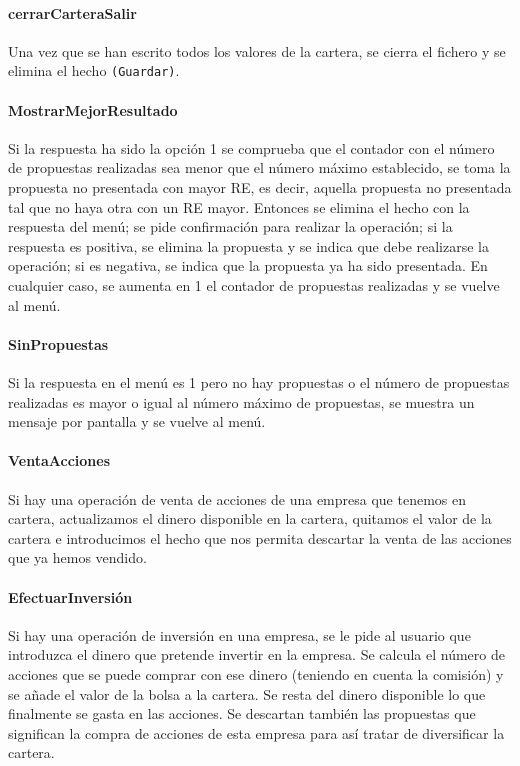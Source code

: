 \documentclass[11pt,leqno]{article}
\theoremstyle{definition_wo_parentheses}
\theoremstyle{plain}
\theoremstyle{remark}
\begin{document}
\paragraph{cerrarCarteraSalir} Una vez que se han escrito todos los valores de la cartera, se cierra el fichero y se elimina el hecho \texttt{(Guardar)}.

\paragraph{MostrarMejorResultado} Si la respuesta ha sido la opción 1 se comprueba que el contador con el número de propuestas realizadas sea menor que el número máximo establecido, se toma la propuesta no presentada con mayor RE, es decir, aquella propuesta no presentada tal que no haya otra con un RE mayor. Entonces se elimina el hecho con la respuesta del menú; se pide confirmación para realizar la operación;  si la respuesta es positiva, se elimina la propuesta y se indica que debe realizarse la operación; si es negativa, se indica que la propuesta ya ha sido presentada. En cualquier caso, se aumenta en 1 el contador de propuestas realizadas y se vuelve al menú.

\paragraph{SinPropuestas} Si la respuesta en el menú es 1 pero no hay propuestas o el número de propuestas realizadas es mayor o igual al número máximo de propuestas, se muestra un mensaje por pantalla y se vuelve al menú. 

\paragraph{VentaAcciones} Si hay una operación de venta de acciones de una empresa que tenemos en cartera, actualizamos el dinero disponible en la cartera, quitamos el valor de la cartera e introducimos el hecho que nos permita descartar la venta de las acciones que ya hemos vendido.

\paragraph{EfectuarInversión} Si hay una operación de inversión en una empresa, se le pide al usuario que introduzca el dinero que pretende invertir en la empresa. Se calcula el número de acciones que se puede comprar con ese dinero (teniendo en cuenta la comisión) y se añade el valor de la bolsa a la cartera. Se resta del dinero disponible lo que finalmente se gasta en las acciones. Se descartan también las propuestas que significan la compra de acciones de esta empresa para así tratar de diversificar la cartera.
\end{document}
